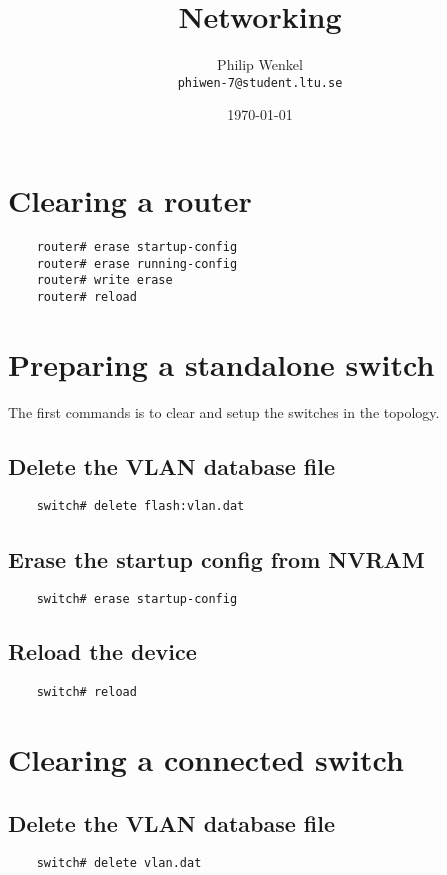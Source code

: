 \documentclass{article}
\title {
	Networking
}
\author {
	Philip Wenkel \\
	{\tt phiwen-7@student.ltu.se}
}
\date{\today}
\begin{document}
\maketitle

\newpage
\tableofcontents

\newpage

\section{Clearing a router}

\begin{verbatim}
	router# erase startup-config
	router# erase running-config
	router# write erase
	router# reload
\end{verbatim}

\section{Preparing a standalone switch}
The first commands is to clear and setup the switches in the topology.


\subsection{Delete the VLAN database file}
\begin{verbatim}
	switch# delete flash:vlan.dat
\end{verbatim}

\subsection{Erase the startup config from NVRAM}
\begin{verbatim}
	switch# erase startup-config
\end{verbatim}

\subsection{Reload the device}
\begin{verbatim}
	switch# reload
\end{verbatim}

\section{Clearing a connected switch}
\subsection{Delete the VLAN database file}
\begin{verbatim}
	switch# delete vlan.dat
\end{verbatim}
\end{document}
